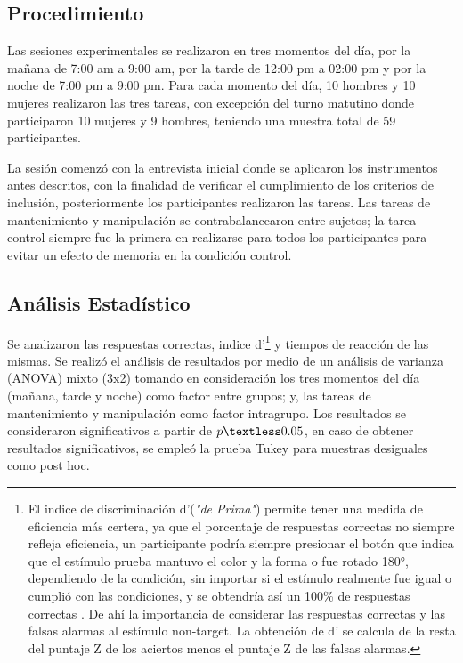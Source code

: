\documentclass[12pt,letterpaper,final]{article}
\let\cite\cite %
\begin{document}
{
\subsection{Procedimiento}
Las sesiones experimentales se realizaron en tres momentos del día, por la mañana de 7:00 am a 9:00 am, por la tarde de 12:00 pm a 02:00 pm y por la noche de 7:00 pm a 9:00 pm. Para cada momento del día, 10 hombres y 10 mujeres realizaron  las tres tareas, con excepción del turno matutino donde participaron 10 mujeres y 9 hombres, teniendo una muestra total de 59 participantes.

La sesión comenzó con la entrevista inicial donde se aplicaron los instrumentos antes descritos, con la finalidad de verificar el cumplimiento de los criterios de inclusión, posteriormente los participantes realizaron las tareas. Las tareas de mantenimiento y manipulación se contrabalancearon entre sujetos; la tarea control siempre fue la primera en realizarse para todos los participantes para evitar un efecto de memoria en la condición control.
}
{
\subsection{Análisis Estadístico}
Se analizaron las respuestas correctas, indice d'\footnote{El indice de discriminación d’(\textit{"de Prima"}) 
permite tener una medida de eficiencia más certera, ya que el porcentaje de respuestas correctas no siempre refleja eficiencia, un participante podría siempre presionar el botón que indica que el estímulo prueba mantuvo el color y la forma o fue rotado \ang{180}, dependiendo de la condición, sin importar si el estímulo realmente fue igual o cumplió con las condiciones, y se obtendría así un 100\% de respuestas correctas \cite{Haatveit2010}. De ahí la importancia de considerar las respuestas correctas y las falsas alarmas al estímulo non-target. La obtención de d’ se calcula de la resta del puntaje Z de los aciertos menos el puntaje Z de las falsas alarmas.}
y tiempos de reacción de las mismas. Se realizó el análisis de resultados  por medio de un análisis de varianza (ANOVA) mixto (3x2) tomando en consideración los tres momentos del día (mañana, tarde y noche) como factor entre grupos; y, las tareas de mantenimiento y manipulación como factor intragrupo.
Los resultados se consideraron significativos a partir de $ p\textless0.05$, en caso de obtener resultados significativos, se empleó la prueba Tukey para muestras desiguales como post hoc.
}
\newpage
\end{document}
